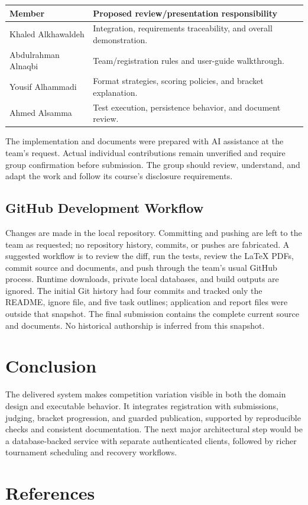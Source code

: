 \begin{tabularx}{\linewidth}{lY}\toprule Member & Proposed review/presentation responsibility\\\midrule
Khaled Alkhawaldeh & Integration, requirements traceability, and overall demonstration.\\
Abdulrahman Alnaqbi & Team/registration rules and user-guide walkthrough.\\
Yousif Alhammadi & Format strategies, scoring policies, and bracket explanation.\\
Ahmed Alsamma & Test execution, persistence behavior, and document review.\\\bottomrule\end{tabularx}

The implementation and documents were prepared with AI assistance at the team's request. Actual individual contributions remain unverified and require group confirmation before submission. The group should review, understand, and adapt the work and follow its course's disclosure requirements.
\subsection{GitHub Development Workflow}
Changes are made in the local repository. Committing and pushing are left to the team as requested; no repository history, commits, or pushes are fabricated. A suggested workflow is to review the diff, run the tests, review the LaTeX PDFs, commit source and documents, and push through the team's usual GitHub process. Runtime downloads, private local databases, and build outputs are ignored. The initial Git history had four commits and tracked only the README, ignore file, and five task outlines; application and report files were outside that snapshot. The final submission contains the complete current source and documents. No historical authorship is inferred from this snapshot.

\section{Conclusion}
The delivered system makes competition variation visible in both the domain design and executable behavior. It integrates registration with submissions, judging, bracket progression, and guarded publication, supported by reproducible checks and consistent documentation. The next major architectural step would be a database-backed service with separate authenticated clients, followed by richer tournament scheduling and recovery workflows.
\clearpage\section{References}


